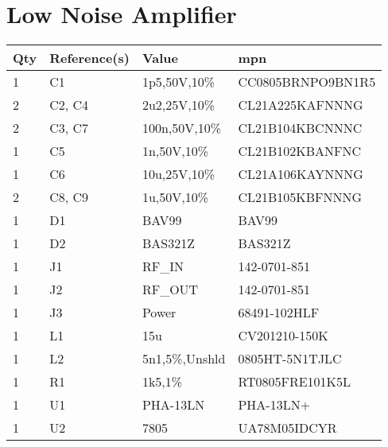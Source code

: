 \section{Low Noise Amplifier}
\begin{center}
    \begin{tabular}[c]{@{} llll @{}}
        \toprule
        Qty & Reference(s) & Value          & \acrshort{mpn}    \\
        \midrule
        1   & C1           & 1p5,50V,10\%   & CC0805BRNPO9BN1R5 \\
        2   & C2, C4       & 2u2,25V,10\%   & CL21A225KAFNNNG   \\
        2   & C3, C7       & 100n,50V,10\%  & CL21B104KBCNNNC   \\
        1   & C5           & 1n,50V,10\%    & CL21B102KBANFNC   \\
        1   & C6           & 10u,25V,10\%   & CL21A106KAYNNNG   \\
        2   & C8, C9       & 1u,50V,10\%    & CL21B105KBFNNNG   \\
        1   & D1           & BAV99          & BAV99             \\
        1   & D2           & BAS321Z        & BAS321Z           \\
        1   & J1           & RF\_IN         & 142-0701-851      \\
        1   & J2           & RF\_OUT        & 142-0701-851      \\
        1   & J3           & Power          & 68491-102HLF      \\
        1   & L1           & 15u            & CV201210-150K     \\
        1   & L2           & 5n1,5\%,Unshld & 0805HT-5N1TJLC    \\
        1   & R1           & 1k5,1\%        & RT0805FRE101K5L   \\
        1   & U1           & PHA-13LN       & PHA-13LN+         \\
        1   & U2           & 7805           & UA78M05IDCYR      \\
        \bottomrule
    \end{tabular}
\end{center}

\newpage
